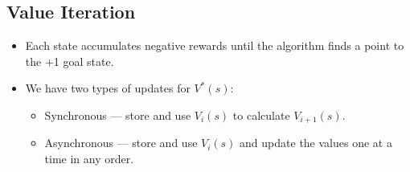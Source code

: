 \documentclass{article}
\begin{document}
\subsection{Value Iteration}
\begin{itemize}
    \item Each state accumulates negative rewards until the algorithm finds a point to the +1 goal state.
    \item We have two types of updates for $V^*(s)$:
        \begin{itemize}
            \item Synchronous --- store and use $V_i(s)$ to calculate $V_{i+1}(s)$.
            \item Asynchronous --- store and use $V_i(s)$ and update the values one at a time in any order.
        \end{itemize}
\end{itemize}
\end{document}
